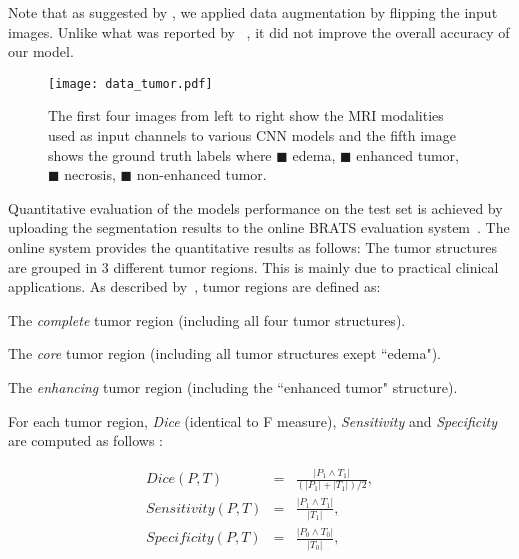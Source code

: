 \documentclass[final,5p,times,twocolumn]{elsarticle}
\begin{document}
Note that as suggested by \citet{Krizhevsky-2012-small}, we applied data augmentation by flipping the input images.  Unlike what was reported by ~\citet{zeiler2014},  it did not improve the overall accuracy of our model. 





\begin{figure}
\centering
\texttt{[image: data\_tumor.pdf]}
\caption{The first four images from left to right show the MRI modalities used as input channels to various CNN models and the fifth image shows the ground truth labels where \textcolor[RGB]{135,213,120}{$\blacksquare$} edema, \textcolor[RGB]{225,225,95}{$\blacksquare$} enhanced tumor,
\textcolor[RGB]{246,145,139}{$\blacksquare$} necrosis,
\textcolor[RGB]{124,167,208}{$\blacksquare$} non-enhanced tumor.}
\label{fig:data}
\end{figure} 

 Quantitative evaluation of the models performance on the test set is achieved by uploading the segmentation results to the online BRATS evaluation system~\citep{BRATSURL}. The online system provides the quantitative results as follows: 
The tumor structures are grouped in 3 different tumor regions. This is mainly due to practical clinical applications. 
As described by~\citet{Menze2014}, tumor regions are defined as:

\begin{enumerate}[a)]

{\setlength\itemindent{25pt} \item The {\it complete} tumor region (including all four tumor structures).}

{\setlength\itemindent{25pt}\item The {\it core} tumor region (including all tumor structures exept ``edema").}

{\setlength\itemindent{25pt}\item The {\it enhancing} tumor region (including the ``enhanced tumor" structure).}

\end{enumerate} 

For each tumor region, {\it Dice} (identical to F measure), {\it Sensitivity} and {\it Specificity} are computed as follows :



\begin{eqnarray}
Dice(P,T) &=& \frac{|P_1 \wedge T_1|}{(|P_1|+|T_1|)/2}, \nonumber \\
Sensitivity(P,T) &=& \frac{|P_1 \wedge T_1|}{|T_1|}, \nonumber \\
Specificity(P,T) &=& \frac{|P_0 \wedge T_0|}{|T_0|}, \nonumber
\end{eqnarray}
\end{document}
